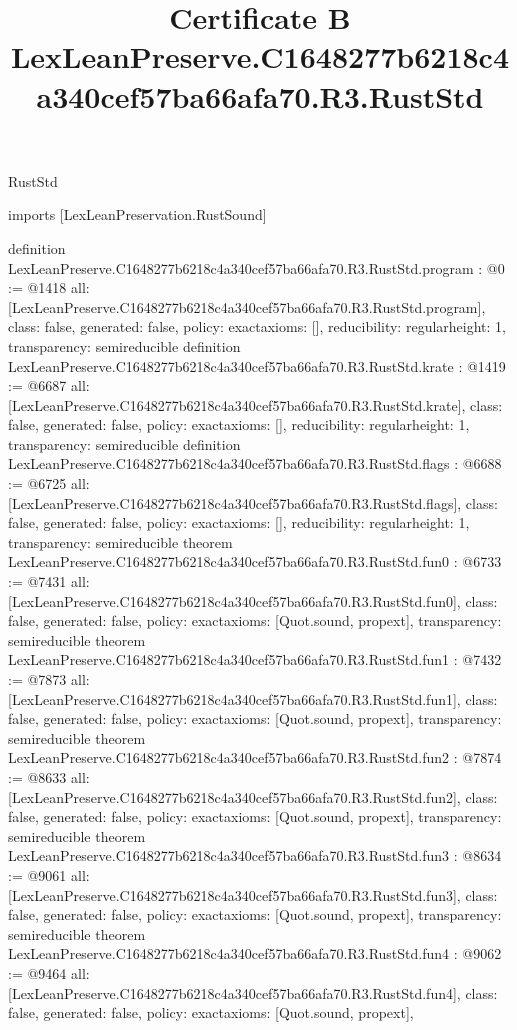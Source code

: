 \begin{lexlean}{RustStd}
\title{Certificate B LexLeanPreserve.C1648277b6218c4a340cef57ba66afa70.R3.RustStd}
\begin{coremodule}
imports [LexLeanPreservation.RustSound]

definition LexLeanPreserve.C1648277b6218c4a340cef57ba66afa70.R3.RustStd.program : @0 := @1418 {
  all: [LexLeanPreserve.C1648277b6218c4a340cef57ba66afa70.R3.RustStd.program],
  class: false,
  generated: false,
  policy: exact{axioms: []},
  reducibility: regular{height: 1},
  transparency: semireducible
}
definition LexLeanPreserve.C1648277b6218c4a340cef57ba66afa70.R3.RustStd.krate : @1419 := @6687 {
  all: [LexLeanPreserve.C1648277b6218c4a340cef57ba66afa70.R3.RustStd.krate],
  class: false,
  generated: false,
  policy: exact{axioms: []},
  reducibility: regular{height: 1},
  transparency: semireducible
}
definition LexLeanPreserve.C1648277b6218c4a340cef57ba66afa70.R3.RustStd.flags : @6688 := @6725 {
  all: [LexLeanPreserve.C1648277b6218c4a340cef57ba66afa70.R3.RustStd.flags],
  class: false,
  generated: false,
  policy: exact{axioms: []},
  reducibility: regular{height: 1},
  transparency: semireducible
}
theorem LexLeanPreserve.C1648277b6218c4a340cef57ba66afa70.R3.RustStd.fun0 : @6733 := @7431 {
  all: [LexLeanPreserve.C1648277b6218c4a340cef57ba66afa70.R3.RustStd.fun0],
  class: false,
  generated: false,
  policy: exact{axioms: [Quot.sound, propext]},
  transparency: semireducible
}
theorem LexLeanPreserve.C1648277b6218c4a340cef57ba66afa70.R3.RustStd.fun1 : @7432 := @7873 {
  all: [LexLeanPreserve.C1648277b6218c4a340cef57ba66afa70.R3.RustStd.fun1],
  class: false,
  generated: false,
  policy: exact{axioms: [Quot.sound, propext]},
  transparency: semireducible
}
theorem LexLeanPreserve.C1648277b6218c4a340cef57ba66afa70.R3.RustStd.fun2 : @7874 := @8633 {
  all: [LexLeanPreserve.C1648277b6218c4a340cef57ba66afa70.R3.RustStd.fun2],
  class: false,
  generated: false,
  policy: exact{axioms: [Quot.sound, propext]},
  transparency: semireducible
}
theorem LexLeanPreserve.C1648277b6218c4a340cef57ba66afa70.R3.RustStd.fun3 : @8634 := @9061 {
  all: [LexLeanPreserve.C1648277b6218c4a340cef57ba66afa70.R3.RustStd.fun3],
  class: false,
  generated: false,
  policy: exact{axioms: [Quot.sound, propext]},
  transparency: semireducible
}
theorem LexLeanPreserve.C1648277b6218c4a340cef57ba66afa70.R3.RustStd.fun4 : @9062 := @9464 {
  all: [LexLeanPreserve.C1648277b6218c4a340cef57ba66afa70.R3.RustStd.fun4],
  class: false,
  generated: false,
  policy: exact{axioms: [Quot.sound, propext]},
}
\end{coremodule}
\end{lexlean}
